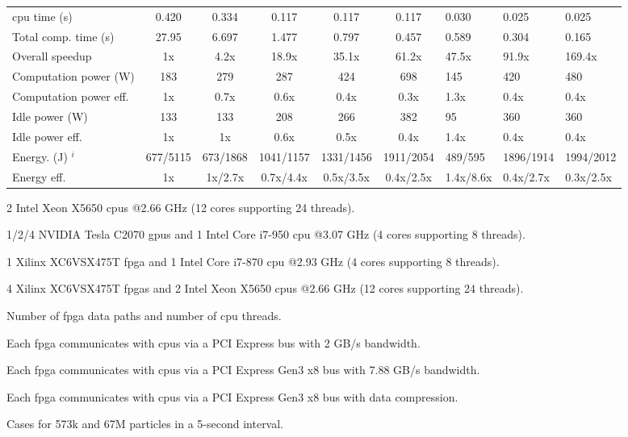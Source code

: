 \begin{table}[ht]
\begin{spacing}{1.0}
\begin{threeparttable}
\begin{tabular}{l || c c c c c g g g}
		\gls{cpu} time (s)							& 0.420							& 0.334						& 0.117						& 0.117						& 0.117						& 0.030		& 0.025		& 0.025		\\
		Total comp. time (s)  					& 27.95							& 6.697 					& 1.477						& 0.797						& 0.457						& 0.589 	& 0.304		& 0.165 	\\
		Overall speedup  						& 1x							& 4.2x	 					& 18.9x						& 35.1x						& 61.2x						& 47.5x 	& 91.9x		& 169.4x	\\
		\hline
		Computation power (W) 	   					& 183							& 279 						& 287  						& 424						& 698						& 145 		& 420		& 480		\\
		Computation power eff.						& 1x							& 0.7x						& 0.6x 						& 0.4x						& 0.3x						& 1.3x 		& 0.4x 		& 0.4x		\\
		Idle power (W)    						& 133							& 133						& 208   					& 266 						& 382						& 95		& 360		& 360		\\
		Idle power eff.					    	& 1x							& 1x						& 0.6x	 					& 0.5x						& 0.4x						& 1.4x 	& 0.4x		& 0.4x		\\
		\hline
		Energy. (J) $^i$						& 677/5115						& 673/1868 					& 1041/1157 				& 1331/1456					& 1911/2054					& 489/595 	& 1896/1914	& 1994/2012	\\
		Energy eff.							& 1x							& 1x/2.7x 					& 0.7x/4.4x 				& 0.5x/3.5x 				& 0.4x/2.5x					& 1.4x/8.6x	& 0.4x/2.7x	& 0.3x/2.5x\\
		\hline
		\end{tabular}
			\begin{tablenotes}
			\item[a] 2 Intel Xeon X5650 \glspl{cpu} @2.66 GHz (12 cores supporting 24 threads).
			\item[b] 1/2/4 NVIDIA Tesla C2070 \gls{gpu}s and 1 Intel Core i7-950 \gls{cpu} @3.07 GHz (4 cores supporting 8 threads).
			\item[c] 1 Xilinx XC6VSX475T \gls{fpga} and 1 Intel Core i7-870 \gls{cpu} @2.93 GHz (4 cores supporting 8 threads).
			\item[d] 4 Xilinx XC6VSX475T \glspl{fpga} and 2 Intel Xeon X5650 \glspl{cpu} @2.66 GHz (12 cores supporting 24 threads).
			\item[e] Number of \gls{fpga} data paths and number of \gls{cpu} threads.
			\item[f] Each \gls{fpga} communicates with \glspl{cpu} via a PCI Express bus with 2 GB/s bandwidth.
			\item[g] Each \gls{fpga} communicates with \glspl{cpu} via a PCI Express Gen3 x8 bus with 7.88 GB/s bandwidth.
			\item[h] Each \gls{fpga} communicates with \glspl{cpu} via a PCI Express Gen3 x8 bus with data compression.
			\item[i] Cases for 573k and 67M particles in a 5-second interval.
			\end{tablenotes}
		\end{threeparttable}
\end{spacing}
\end{table}

